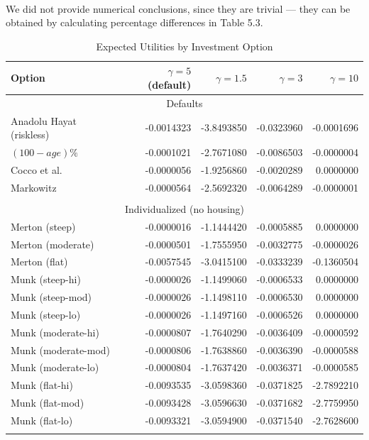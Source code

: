 \paragraph{}We did not provide numerical conclusions, since they are trivial --- they can be obtained by calculating percentage differences in Table 5.3.

\begin{table}%
	\centering
	\caption{Expected Utilities by Investment Option}
	\begin{tabular}[c]{lrrrr}
		\hline
		Option&$\gamma=5$ (default) & $\gamma=1.5$ & $\gamma=3$ & $\gamma=10$\\
		\hline
\multicolumn{5}{c}{Defaults}\\
Anadolu Hayat (riskless)&-0.0014323&-3.8493850&-0.0323960&-0.0001696\\
$(100-age)\%$&-0.0001021&-2.7671080&-0.0086503&-0.0000004\\
Cocco et al.&-0.0000056&-1.9256860&-0.0020289&0.0000000\\
Markowitz&-0.0000564&-2.5692320&-0.0064289&-0.0000001\\
\multicolumn{5}{c}{}\\
\multicolumn{5}{c}{Individualized (no housing)}\\
Merton (steep) &-0.0000016&-1.1444420&-0.0005885&0.0000000\\
Merton (moderate) &-0.0000501&-1.7555950&-0.0032775&-0.0000026\\
Merton (flat) &-0.0057545&-3.0415100&-0.0333239&-0.1360504\\
Munk (steep-hi) &-0.0000026&-1.1499060&-0.0006533&0.0000000\\
Munk (steep-mod)&-0.0000026&-1.1498110&-0.0006530&0.0000000\\
Munk (steep-lo) &-0.0000026&-1.1497160&-0.0006526&0.0000000\\
Munk (moderate-hi)&-0.0000807&-1.7640290&-0.0036409&-0.0000592\\
Munk (moderate-mod)&-0.0000806&-1.7638860&-0.0036390&-0.0000588\\
Munk (moderate-lo)&-0.0000804&-1.7637420&-0.0036371&-0.0000585\\
Munk (flat-hi) &-0.0093535&-3.0598360&-0.0371825&-2.7892210\\
Munk (flat-mod) &-0.0093428&-3.0596630&-0.0371682&-2.7759950\\
Munk (flat-lo) &-0.0093321&-3.0594900&-0.0371540&-2.7628600\\
\multicolumn{5}{c}{}\\

\end{tabular}
\end{table}

